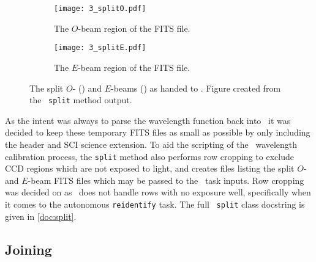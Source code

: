 \begin{figure}[t]
    \centering
    \begin{subfigure}[b]{1.0 \textwidth}
        \centering
        \texttt{[image: 3\_splitO.pdf]}
        \caption{The $O$-beam region of the \gls{FITS} file.}
        \label{subfig:split_O}
    \end{subfigure}
    \centering
    \begin{subfigure}[b]{1.0\textwidth}
        \centering
        \texttt{[image: 3\_splitE.pdf]}
        \caption{The $E$-beam region of the \gls{FITS} file.}
        \label{subfig:split_E}
    \end{subfigure}
    \caption{
        The split $O$- () and $E$-beams () as handed to \iraf.
        Figure created from the \stops\ \texttt{split} method output.
    }
    \label{fig:OE_split}
\end{figure}

As the intent was always to parse the wavelength function back into \polsalt\ it was decided to keep these temporary \gls{FITS} files as small as possible by only including the header and \gls{SCI} science extension.
%
To aid the scripting of the \iraf\ wavelength calibration process, the \texttt{split} method also performs row cropping to exclude \gls{CCD} regions which are not exposed to light, and creates files listing the split $O$- and $E$-beam \gls{FITS} files which may be passed to the \iraf\ task inputs.
Row cropping was decided on as \iraf\ does not handle rows with no exposure well, specifically when it comes to the autonomous \texttt{reidentify} task.
The full \stops\ \texttt{split} class docstring is given in \autoref{doc:split}.

\subsection{Joining} \label{subsec:stops_join}




